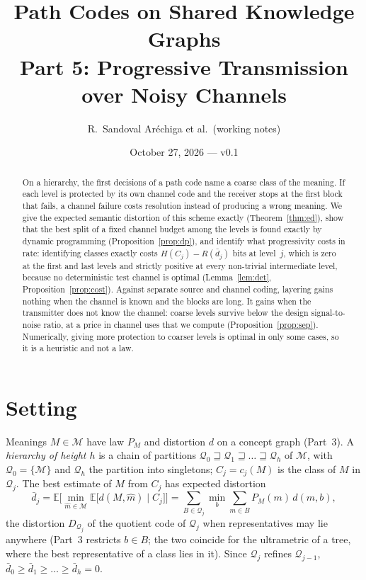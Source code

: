 \documentclass[11pt]{article}
\title{Path Codes on Shared Knowledge Graphs\\[2pt]\large Part 5: Progressive Transmission over Noisy Channels}
\author{R.~Sandoval Ar\'echiga et al.\ (working notes)}
\date{October 27, 2026 --- v0.1}
\theoremstyle{definition}
\theoremstyle{remark}
\newcommand{\M}{\mathcal{M}}
\newcommand{\Q}{\mathcal{Q}}
\newcommand{\E}{\mathbb{E}}
\begin{document}
\maketitle

\begin{abstract}
On a hierarchy, the first decisions of a path code name a coarse class of the meaning. If each level is protected by its own channel code and the receiver stops at the first block that fails, a channel failure costs resolution instead of producing a wrong meaning. We give the expected semantic distortion of this scheme exactly (Theorem~\ref{thm:ed}), show that the best split of a fixed channel budget among the levels is found exactly by dynamic programming (Proposition~\ref{prop:dp}), and identify what progressivity costs in rate: identifying classes exactly costs $H(C_j)-R(\bar d_j)$ bits at level~$j$, which is zero at the first and last levels and strictly positive at every non-trivial intermediate level, because no deterministic test channel is optimal (Lemma~\ref{lem:det}, Proposition~\ref{prop:cost}). Against separate source and channel coding, layering gains nothing when the channel is known and the blocks are long. It gains when the transmitter does not know the channel: coarse levels survive below the design signal-to-noise ratio, at a price in channel uses that we compute (Proposition~\ref{prop:sep}). Numerically, giving more protection to coarser levels is optimal in only some cases, so it is a heuristic and not a law.
\end{abstract}

\section{Setting}

Meanings $M\in\M$ have law $P_M$ and distortion $d$ on a concept graph (Part~3). A \emph{hierarchy of height $h$} is a chain of partitions $\Q_0\sqsupseteq\Q_1\sqsupseteq\dots\sqsupseteq\Q_h$ of $\M$, with $\Q_0=\{\M\}$ and $\Q_h$ the partition into singletons; $C_j=c_j(M)$ is the class of $M$ in $\Q_j$. The best estimate of $M$ from $C_j$ has expected distortion
\[
\bar d_j=\E\Big[\min_{\hat m\in\M}\E\big[d(M,\hat m)\mid C_j\big]\Big]=\sum_{B\in\Q_j}\min_{b}\sum_{m\in B}P_M(m)\,d(m,b),
\]
the distortion $D_{\Q_j}$ of the quotient code of $\Q_j$ when representatives may lie anywhere (Part~3 restricts $b\in B$; the two coincide for the ultrametric of a tree, where the best representative of a class lies in it). Since $\Q_{j}$ refines $\Q_{j-1}$, $\bar d_0\ge\bar d_1\ge\dots\ge\bar d_h=0$.
\end{document}
